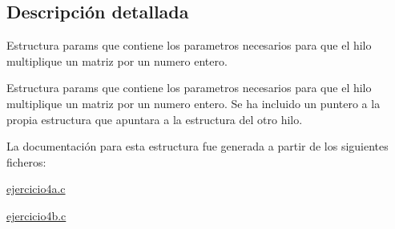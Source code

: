 \subsection{Descripción detallada}
Estructura params que contiene los parametros necesarios para que el hilo multiplique un matriz por un numero entero. 

Estructura params que contiene los parametros necesarios para que el hilo multiplique un matriz por un numero entero. Se ha incluido un puntero a la propia estructura que apuntara a la estructura del otro hilo. 

La documentación para esta estructura fue generada a partir de los siguientes ficheros\+:\begin{DoxyCompactItemize}
\item 
\hyperlink{ejercicio4a_8c}{ejercicio4a.\+c}\item 
\hyperlink{ejercicio4b_8c}{ejercicio4b.\+c}\end{DoxyCompactItemize}
